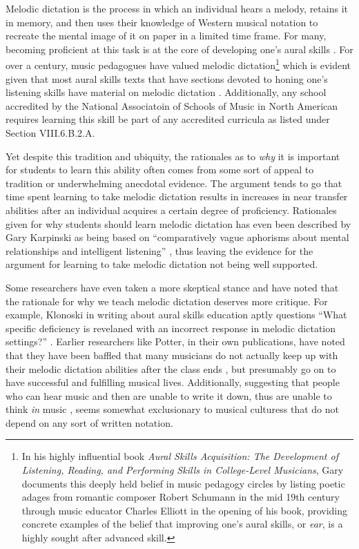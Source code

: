 \documentclass[]{book}
\let\rmarkdownfootnote\footnote%
\def\footnote{\protect\rmarkdownfootnote}
\theoremstyle{definition}
\theoremstyle{definition}
\theoremstyle{definition}
\theoremstyle{remark}
\begin{document}
Melodic dictation is the process in which an individual hears a melody,
retains it in memory, and then uses their knowledge of Western musical
notation to recreate the mental image of it on paper in a limited time
frame. For many, becoming proficient at this task is at the core of
developing one's aural skills \citep{karpinskiModelMusicPerception1990}.
For over a century, music pedagogues have valued melodic
dictation\footnote{In his highly influential book \emph{Aural Skills
  Acquisition: The Development of Listening, Reading, and Performing
  Skills in College-Level Musicians}, Gary
  \citet{karpinskiAuralSkillsAcquisition2000} documents this deeply held
  belief in music pedagogy circles by listing poetic adages from
  romantic composer Robert Schumann in the mid 19th century through
  music educator Charles Elliott in the opening of his book, providing
  concrete examples of the belief that improving one's aural skills, or
  \emph{ear}, is a highly sought after advanced skill. } which is
evident given that most aural skills texts that have sections devoted to
honing one's listening skills have material on melodic dictation
\citep{karpinskiAuralSkillsAcquisition2000}. Additionally, any school
accredited by the National Associatoin of Schools of Music in North
American requires learning this skill be part of any accredited
curricula as listed under Section VIII.6.B.2.A.

Yet despite this tradition and ubiquity, the rationales as to \emph{why}
it is important for students to learn this ability often comes from some
sort of appeal to tradition or underwhelming anecdotal evidence. The
argument tends to go that time spent learning to take melodic dictation
results in increases in near transfer abilities after an individual
acquires a certain degree of proficiency. Rationales given for why
students should learn melodic dictation has even been described by Gary
Karpinski as being based on ``comparatively vague aphorisms about mental
relationships and intelligent listening''
\citep[p.192]{karpinskiModelMusicPerception1990}, thus leaving the
evidence for the argument for learning to take melodic dictation not
being well supported.

Some researchers have even taken a more skeptical stance and have noted
that the rationale for why we teach melodic dictation deserves more
critique. For example, Klonoski in writing about aural skills education
aptly questions ``What specific deficiency is revelaned with an
incorrect response in melodic dictation settings?''
\citep{klonoskiImprovingDictationAuralSkills2006}. Earlier researchers
like Potter, in their own publications, have noted that they have been
baffled that many musicians do not actually keep up with their melodic
dictation abilities after the class ends
\citep{potterIdentifyingSucessfulDictation1990}, but presumably go on to
have successful and fulfilling musical lives. Additionally, suggesting
that people who can hear music and then are unable to write it down,
thus are unable to think \emph{in} music
\citep{karpinskiAuralSkillsAcquisition2000}, seems somewhat exclusionary
to musical culturess that do not depend on any sort of written notation.
\end{document}
